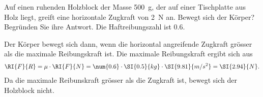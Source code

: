 
\begin{aufgabe}
	Auf einen ruhenden Holzblock der Masse \SI{500}{g}, der auf einer Tischplatte aus Holz liegt, greift eine horizontale Zugkraft von \SI{2}{N} an.
	Bewegt sich der Körper? Begründen Sie ihre Antwort. Die Haftreibungszahl ist \num{0.6}.


	\begin{loesung}
		Der Körper bewegt sich dann, wenn die horizontal angreifende Zugkraft grösser als die maximale Reibungskraft ist.
		Die maximale Reibungskraft ergibt sich aus
		\begin{eqnarray*}
			\RI{F}{R}=\mu\cdot\RI{F}{N}=\num{0.6}\cdot\SI{0.5}{kg}\cdot\SI{9.81}{m/s^2}=\SI{2.94}{N}.
		\end{eqnarray*}
		Da die maximale Reibunskraft grösser als die Zugkraft ist, bewegt sich der Holzblock nicht.
	\end{loesung}


\end{aufgabe}

